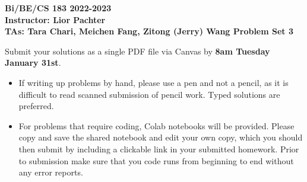 \documentclass[11pt]{exam}
\begin{document}
\begin{center}

     \textbf{Bi/BE/CS 183 2022-2023\\ Instructor: Lior Pachter\\ TAs: Tara Chari, Meichen Fang, Zitong (Jerry) Wang \vskip 0.15in Problem Set 3}

\end{center}
Submit your solutions as a single PDF file via Canvas by {\bf 8am Tuesday January 31st}. 
\begin{itemize}
  \item If writing up problems by hand, please use a pen and not a pencil, as it is difficult to read scanned submission of pencil work. Typed solutions are preferred.
  \item For problems that require coding, Colab notebooks will be provided. Please copy and save the shared notebook and edit your own copy, which you should then submit by including a clickable link in your submitted homework. Prior to submission make sure that you code runs from beginning to end without any error reports.
  \end{itemize}
\end{document}
